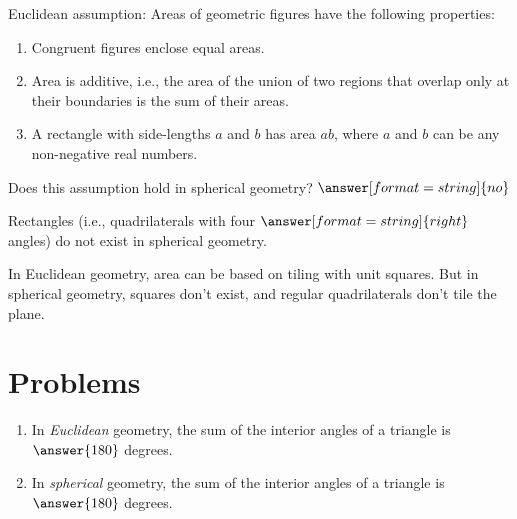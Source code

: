 \documentclass{ximera}
\begin{document}
\begin{problem} %
Euclidean assumption:  Areas of geometric figures have the following properties: 
\begin{enumerate}
\item Congruent figures enclose equal areas.
\item Area is additive, i.e., the area of the union of two regions that overlap only at their boundaries is the sum of their areas. 
\item A rectangle with side-lengths $a$ and $b$ has area $ab$, where $a$ and $b$ can be any non-negative real numbers.
\end{enumerate}

Does this assumption hold in spherical geometry? 
$\answer[format=string]{no}$
\begin{problem}
Rectangles (i.e., quadrilaterals with four $\answer[format=string]{right}$ angles) do not exist in spherical geometry.  %

In Euclidean geometry, area can be based on tiling with unit squares.  But in spherical geometry, squares don't exist, and regular quadrilaterals don't tile the plane.
\end{problem}
\end{problem}


\section*{Problems}

\begin{problem}
\begin{enumerate}
\item In \emph{Euclidean} geometry, the sum of the interior angles of a triangle is 
$\answer{180}$ degrees.
\item In \emph{spherical} geometry, the sum of the interior angles of a triangle is 
$\answer{180}$ degrees.
\end{enumerate}
\end{problem}
\end{document}
